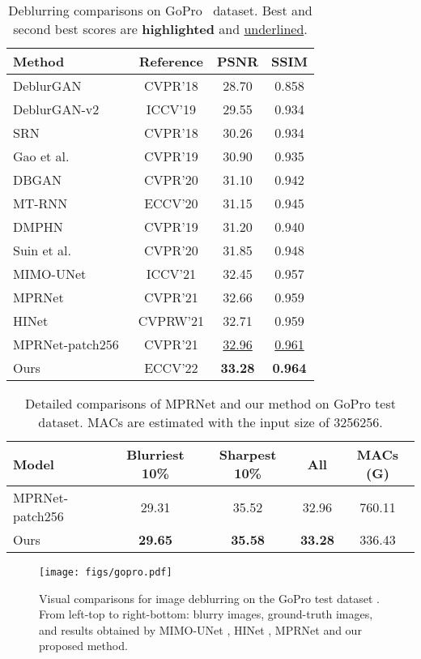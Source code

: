 \documentclass[runningheads]{llncs}
\begin{document}
 
\begin{table}[t]
\centering

\begin{tabular}{l|ccc}
\hline

Method & Reference & PSNR & SSIM\\
\hline
DeblurGAN~\cite{kupyn2018deblurgan}& CVPR'18 & 28.70 & 0.858\\
DeblurGAN-v2~\cite{kupyn2019deblurgan} & ICCV'19 & 29.55 & 0.934\\
SRN~\cite{tao2018srndeblur} & CVPR'18 & 30.26 & 0.934\\
Gao et al.~\cite{gao2019dynamic} & CVPR'19 & 30.90 & 0.935\\
DBGAN~\cite{zhang2020deblurring} & CVPR'20 & 31.10 & 0.942\\
MT-RNN~\cite{park2020multi} & ECCV'20 & 31.15 & 0.945\\
DMPHN~\cite{deepstacked} & CVPR'19 & 31.20 & 0.940\\
Suin et al.~\cite{suin2020spatially} & CVPR'20 & 31.85 & 0.948\\
MIMO-UNet~\cite{MIMO_UNet} & ICCV'21 & 32.45 & 0.957 \\
MPRNet~\cite{Zamir2021MPRNet} & CVPR'21 & 32.66 & 0.959 \\
HINet~\cite{HINet} & CVPRW'21 & 32.71 & 0.959 \\
MPRNet-patch256~\cite{Zamir2021MPRNet} & CVPR'21 & \underline{32.96} & \underline{0.961} \\ 
\hline
Ours & ECCV'22 &\textbf{33.28} & \textbf{0.964}\\
\hline
\end{tabular}
\caption{Deblurring comparisons on GoPro~\cite{deblur-multi-scale} dataset. Best and second best scores are \textbf{highlighted} and \underline{underlined}.}
\label{tb:gopro}
\end{table} \begin{table}[t]
\centering
		\setlength{\tabcolsep}{2pt}
		\begin{tabular}{l|c|c|c|c}
			\hline
			Model & Blurriest 10\% & Sharpest 10\% & All & MACs (G) \\  \hline 
			MPRNet-patch256 \cite{Zamir2021MPRNet} & 29.31 & 35.52 & 32.96 & 760.11 \\ \hline
			Ours & \textbf{29.65} & \textbf{35.58} & \textbf{33.28} & 336.43 \\ \hline
		\end{tabular}
	\caption{Detailed comparisons of MPRNet \cite{Zamir2021MPRNet} and our method on GoPro test dataset\cite{deblur-multi-scale}. MACs are estimated with the input size of 3256256. }
	\label{tb:macs}
\end{table} \begin{figure*}[t]
  \centering
   \texttt{[image: figs/gopro.pdf]}
   \caption{Visual comparisons for image deblurring on the GoPro test dataset \cite{deblur-multi-scale}. From left-top to right-bottom: blurry images, ground-truth images, and results obtained by MIMO-UNet \cite{MIMO_UNet}, HINet \cite{HINet}, MPRNet \cite{Zamir2021MPRNet} and our proposed method.}
   \label{fig:gopro_pics}
\end{figure*}
\end{document}
